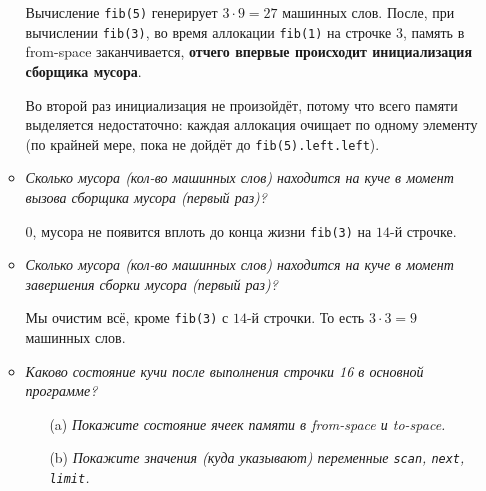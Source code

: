 \documentclass{article}
\begin{document}
\begin{enumerate}
\begin{itemize}
        Вычисление \texttt{fib(5)} генерирует $3 \cdot 9 = 27$ машинных слов. После, при вычислении \texttt{fib(3)}, во время аллокации \texttt{fib(1)} на строчке $3$, память в from-space заканчивается, \textbf{отчего впервые происходит инициализация сборщика мусора}.

        Во второй раз инициализация не произойдёт, потому что всего памяти выделяется недостаточно: каждая аллокация очищает по одному элементу (по крайней мере, пока не дойдёт до \texttt{fib(5).left.left}).

        \item \textit{Сколько мусора (кол-во машинных слов) находится на куче в момент вызова сборщика мусора (первый раз)?}

        $0$, мусора не появится вплоть до конца жизни \texttt{fib(3)} на $14$-й строчке.

        \item \textit{Сколько мусора (кол-во машинных слов) находится на куче в момент завершения сборки мусора (первый раз)?}

        Мы очистим всё, кроме \texttt{fib(3)} с $14$-й строчки. То есть $3\cdot3 = 9$ машинных слов. 

        \item \textit{Каково состояние кучи после выполнения строчки 16 в основной программе?} \begin{itemize}
            \item[(a)] \textit{Покажите состояние ячеек памяти в from-space и to-space.}

            \item[(b)] \textit{Покажите значения (куда указывают) переменные \texttt{scan}, \texttt{next}, \texttt{limit}.}
        \end{itemize}
        
    \end{itemize}
    
\end{enumerate}
\end{document}
